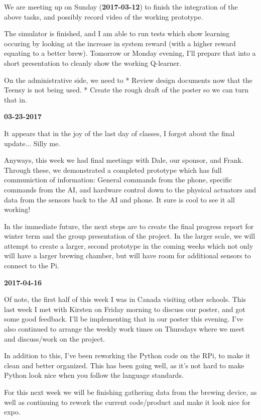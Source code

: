 We are meeting up on Sunday (\textbf{2017-03-12}) to finish the integration of the above tasks, and possibly record video of the working prototype.

The simulator is finished, and I am able to run tests which show learning occuring by looking at the increase in system reward (with a higher reward equating to a better brew). Tomorrow or Monday evening, I'll prepare that into a short presentation to cleanly show the working Q-learner.

On the administrative side, we need to
* Review design documents now that the Teensy is not being used.
* Create the rough draft of the poster so we can turn that in.

\textbf{03-23-2017}

It appears that in the joy of the last day of classes, I forgot about the final update... Silly me.

Anyways, this week we had final meetings with Dale, our sponsor, and Frank. Through these, we demonstrated a completed prototype which has full communiction of information: General commands from the phone, specific commands from the AI, and hardware control down to the physical actuators and data from the sensors back to the AI and phone. It sure is cool to see it all working!

In the immediate future, the next steps are to create the final progress report for winter term and the group presentation of the project.
In the larger scale, we will attempt to create a larger, second prototype in the coming weeks which not only will have a larger brewing chamber, but will have room for additional sensors to connect to the Pi.

\textbf{2017-04-16}

Of note, the first half of this week I was in Canada visiting other schools.
This last week I met with Kirsten on Friday morning to discuss our poster, and got some good feedback. I'll be implementing that in our poster this evening.
I've also continued to arrange the weekly work times on Thursdays where we meet and discuss/work on the project.

In addition to this, I've been reworking the Python code on the RPi, to make it clean and better organized. This has been going well, as it's not hard to make Python look nice when you follow the language standards.

For this next week we will be finishing gathering data from the brewing device, as well as continuing to rework the current code/product and make it look nice for expo.

